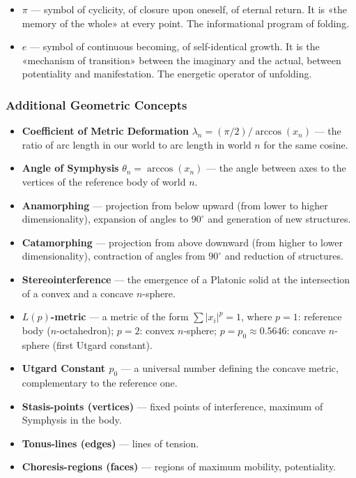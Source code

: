 \documentclass[a4paper,12pt]{article}
\begin{document}
	\begin{itemize}
		\item $\pi$ — symbol of cyclicity, of closure upon oneself, of eternal return. It is «the memory of the whole» at every point. The informational program of folding.
		\item $e$ — symbol of continuous becoming, of self-identical growth. It is the «mechanism of transition» between the imaginary and the actual, between potentiality and manifestation. The energetic operator of unfolding.
	\end{itemize}
	
	\subsubsection{Additional Geometric Concepts}
	
	\begin{itemize}
		\item \textbf{Coefficient of Metric Deformation} $\lambda_n = (\pi/2) / \arccos(x_n)$ — the ratio of arc length in our world to arc length in world $n$ for the same cosine.
		\item \textbf{Angle of Symphysis} $\theta_n = \arccos(x_n)$ — the angle between axes to the vertices of the reference body of world $n$.
		\item \textbf{Anamorphing} — projection from below upward (from lower to higher dimensionality), expansion of angles to $90^\circ$ and generation of new structures.
		\item \textbf{Catamorphing} — projection from above downward (from higher to lower dimensionality), contraction of angles from $90^\circ$ and reduction of structures.
		\item \textbf{Stereointerference} — the emergence of a Platonic solid at the intersection of a convex and a concave $n$-sphere.
		\item \textbf{$L(p)$-metric} — a metric of the form $\sum |x_i|^p = 1$, where $p=1$: reference body ($n$-octahedron); $p=2$: convex $n$-sphere; $p=p_0 \approx 0.5646$: concave $n$-sphere (first Utgard constant).
		\item \textbf{Utgard Constant $p_0$} — a universal number defining the concave metric, complementary to the reference one.
		\item \textbf{Stasis-points (vertices)} — fixed points of interference, maximum of Symphysis in the body.
		\item \textbf{Tonus-lines (edges)} — lines of tension.
		\item \textbf{Choresis-regions (faces)} — regions of maximum mobility, potentiality.
	\end{itemize}
	
\end{document}
